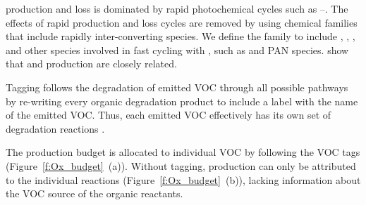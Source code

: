  production and loss is dominated by rapid photochemical cycles such as --.
The effects of rapid production and loss cycles are removed by using chemical families that include rapidly inter-converting species.
We define the  family to include , , ,  and other species involved in fast cycling with , such as  and PAN species.
\citet{Butler:2011} show that  and  production are closely related.

Tagging follows the degradation of emitted VOC through all possible pathways by re-writing every organic degradation product to include a label with the name of the emitted VOC.
Thus, each emitted VOC effectively has its own set of degradation reactions \citep{Butler:2011}.

%        
%        

The  production budget is allocated to individual VOC by following the VOC tags \mbox{(Figure \ref{f:Ox_budget} (a)).}
Without tagging,  production can only be attributed to the individual reactions \mbox{(Figure \ref{f:Ox_budget} (b))}, lacking information about the VOC source of the organic reactants.

